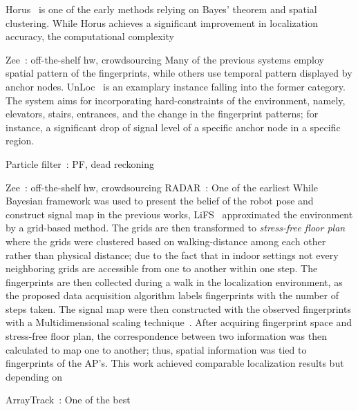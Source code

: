     Horus~\cite{youssef2005horus} is one of the early methods relying on Bayes' theorem and spatial clustering.
    While Horus achieves a significant improvement in localization accuracy, the computational complexity

    Zee~\cite{rai2012zee}: off-the-shelf hw, crowdsourcing
    Many of the previous systems employ spatial pattern of the fingerprints, while others use temporal pattern displayed by anchor nodes.
    UnLoc~\cite{wang2012no} is an examplary instance falling into the former category.
    The system aims for incorporating hard-constraints of the environment, namely, elevators, stairs, entrances, and the change in the fingerprint patterns; for instance, a significant drop of signal level of a specific anchor node in a specific region.


    Particle filter~\cite{biswas2010wifi}: PF, dead reckoning

    Zee~\cite{rai2012zee}: off-the-shelf hw, crowdsourcing
    RADAR~\cite{radar}: One of the earliest
    While Bayesian framework was used to present the belief of the robot pose and construct signal map in the previous works, LiFS~\cite{yang2012locating} approximated the environment by a grid-based method.
    The grids are then transformed to \textit{stress-free floor plan} where the grids were clustered based on walking-distance among each other rather than physical distance; due to the fact that in indoor settings not every neighboring grids are accessible from one to another within one step.
    The fingerprints are then collected during a walk in the localization environment, as the proposed data acquisition algorithm labels fingerprints with the number of steps taken.
    The signal map were then constructed with the observed fingerprints with a Multidimensional scaling technique~\cite{borg2005modern}.
    After acquiring fingerprint space and stress-free floor plan, the correspondence between two information was then calculated to map one to another; thus, spatial information was tied to fingerprints of the AP's.
    This work achieved comparable localization results but depending on

    ArrayTrack~\cite{xiong2013arraytrack}: One of the best


